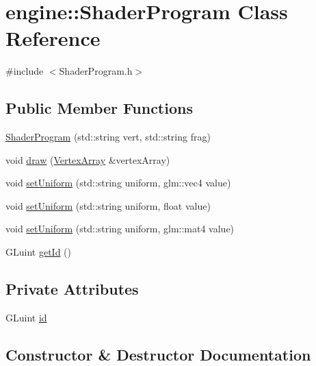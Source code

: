 \hypertarget{classengine_1_1_shader_program}{}\section{engine\+:\+:Shader\+Program Class Reference}
\label{classengine_1_1_shader_program}


{\ttfamily \#include $<$Shader\+Program.\+h$>$}

\subsection*{Public Member Functions}
\begin{DoxyCompactItemize}
\item 
\mbox{\hyperlink{classengine_1_1_shader_program_aba163516906f42e0bd4527d040eb81cb}{Shader\+Program}} (std\+::string vert, std\+::string frag)
\item 
void \mbox{\hyperlink{classengine_1_1_shader_program_a3da1f3d00e40dda138043904f26dd131}{draw}} (\mbox{\hyperlink{classengine_1_1_vertex_array}{Vertex\+Array}} \&vertex\+Array)
\item 
void \mbox{\hyperlink{classengine_1_1_shader_program_ad2b22cfa943ff357f15829e52021fa4d}{set\+Uniform}} (std\+::string uniform, glm\+::vec4 value)
\item 
void \mbox{\hyperlink{classengine_1_1_shader_program_a18c5e26e9a2e44fcc996de868c70c22d}{set\+Uniform}} (std\+::string uniform, float value)
\item 
void \mbox{\hyperlink{classengine_1_1_shader_program_ad99e2efc09eaa6a90df11c19cd85aba7}{set\+Uniform}} (std\+::string uniform, glm\+::mat4 value)
\item 
G\+Luint \mbox{\hyperlink{classengine_1_1_shader_program_ab5816c47f12daf714140b952daf3650a}{get\+Id}} ()
\end{DoxyCompactItemize}
\subsection*{Private Attributes}
\begin{DoxyCompactItemize}
\item 
G\+Luint \mbox{\hyperlink{classengine_1_1_shader_program_a4114a65713b84771ce13f5eea1f1a19e}{id}}
\end{DoxyCompactItemize}


\subsection{Constructor \& Destructor Documentation}
\mbox{\label{classengine_1_1_shader_program_aba163516906f42e0bd4527d040eb81cb}} 
